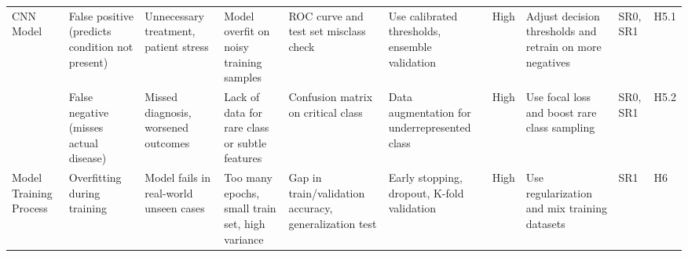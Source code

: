 \documentclass{article}
\begin{document}
\begin{landscape}
\begin{table}[hp]
\begin{footnotesize}
\begin{tabular}{@{}p{1.1in}p{1in}p{1.1in}p{1.5in}p{0.6in}p{0.9in}p{0.3in}p{1.9in}p{0.3in}p{0.4in}@{}}
\midrule
\multirow{2}{*}{CNN Model} & False positive (predicts condition not present) & Unnecessary treatment, patient stress & Model overfit on noisy training samples & ROC curve and test set misclass check & Use calibrated thresholds, ensemble validation & High & Adjust decision thresholds and retrain on more negatives & SR0, SR1 & H5.1 \\
\cmidrule(lr){2-10}
& False negative (misses actual disease) & Missed diagnosis, worsened outcomes & Lack of data for rare class or subtle features & Confusion matrix on critical class & Data augmentation for underrepresented class & High & Use focal loss and boost rare class sampling & SR0, SR1 & H5.2 \\
\midrule
Model Training Process & Overfitting during training & Model fails in real-world unseen cases & Too many epochs, small train set, high variance & Gap in train/validation accuracy, generalization test & Early stopping, dropout, K-fold validation & High & Use regularization and mix training datasets & SR1 & H6 \\
\bottomrule
\end{tabular}
\end{footnotesize}
\end{table}
\end{landscape}
\restoregeometry
\end{document}
